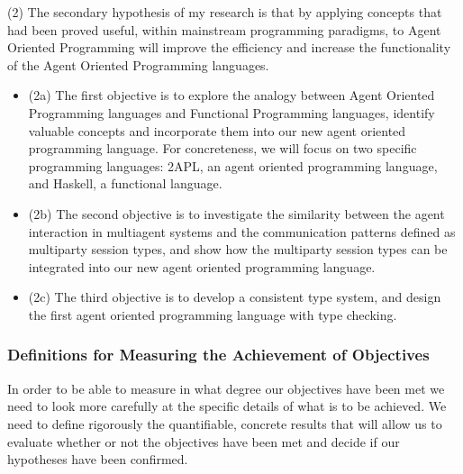 \documentclass[a4paper,12pt,oneside,fleqn]{book} %
\begin{document}
(2) The secondary hypothesis of my research is that by applying concepts
that had been proved useful, within mainstream programming paradigms, to
Agent Oriented Programming will improve the efficiency and increase
the functionality of the Agent Oriented Programming languages. 
\begin{itemize}

  \item (2a) The first objective is to explore the analogy between Agent
    Oriented Programming languages and Functional Programming languages,
    identify valuable concepts and incorporate them into our new agent
    oriented programming language. For concreteness, we will focus on two
    specific programming languages: 2APL, an agent oriented programming
    language, and Haskell, a functional language. 

  \item (2b) The second objective is to investigate the similarity between
    the agent interaction in multiagent systems and the communication
    patterns defined as multiparty session types, and show how the
    multiparty session types can be integrated into our new agent oriented
    programming language.

  \item (2c) The third objective is to develop a consistent type system,
    and design the first agent oriented programming language with
    type checking.

\end{itemize}


\subsubsection{Definitions for Measuring the Achievement of Objectives}%

In order to be able to measure in what degree our objectives have been met
we need to look more carefully at the specific details of what is to be
achieved. We need to define rigorously the quantifiable, concrete results
that will allow us to evaluate whether or not the objectives have been met
and decide if our hypotheses have been confirmed.
\end{document}
